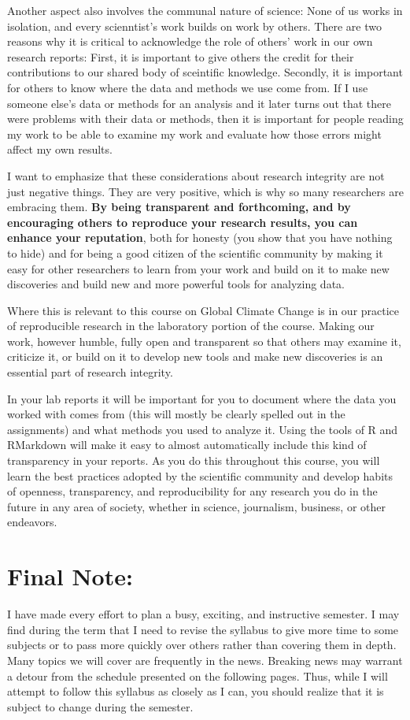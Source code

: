 \documentclass[11pt,twoside]{jgsyllabus}\usepackage[]{graphicx}\usepackage[]{color}
\begin{document}
Another aspect also involves the communal nature of science: None of us works
in isolation, and every scienntist's work builds on work by others.
There are two reasons why it is critical to acknowledge the role of others' work
in our own research reports: First, it is important to give others the credit
for their contributions to our shared body of sceintific knowledge. Secondly,
it is important for others to know where the data and methods we use come from.
If I use someone else's data or methods for an analysis and it later turns out
that there were problems with their data or methods, then it is important for
people reading my work to be able to examine my work and evaluate how those
errors might affect my own results.

I want to emphasize that these considerations about research integrity are not
just negative things. They are very positive, which is why so many researchers
are embracing them.
\textbf{By being transparent and forthcoming, and by encouraging
others to reproduce your research results, you can enhance your reputation},
both for honesty (you show that you have nothing to hide) and for being a
good citizen of the scientific community by making it easy for other researchers
to learn from your work and build on it to make new discoveries and build
new and more powerful tools for analyzing data.

Where this is relevant to this course on Global Climate Change is in our
practice of reproducible research in the laboratory portion of the course.
Making our work, however humble, fully open and transparent so that others
may examine it, criticize it, or build on it to develop new tools and make
new discoveries is an essential part of research integrity.

In your lab reports it will be important for you to document where the data you
worked with comes from (this will mostly be clearly spelled out in the
assignments) and what methods you used to analyze it. Using the tools of R and
RMarkdown will make it easy to almost automatically include this kind of
transparency in your reports. As you do this throughout this course, you will
learn the best practices adopted by the scientific community and develop habits
of openness, transparency, and reproducibility for any research you do in the
future in any area of society, whether in science, journalism, business, or
other endeavors.

\section{Final Note:}
I have made every effort to plan a busy, exciting, and instructive semester.
I may find during the term that I need to revise the syllabus to give more time
to some subjects or to pass more quickly over others rather than covering them
in depth. Many topics we will cover are frequently in the news. Breaking news
may warrant a detour from the schedule presented on the following pages.
Thus, while I will attempt to follow this syllabus as closely as I can,
you should realize that it is subject to change during the semester.
\end{document}
